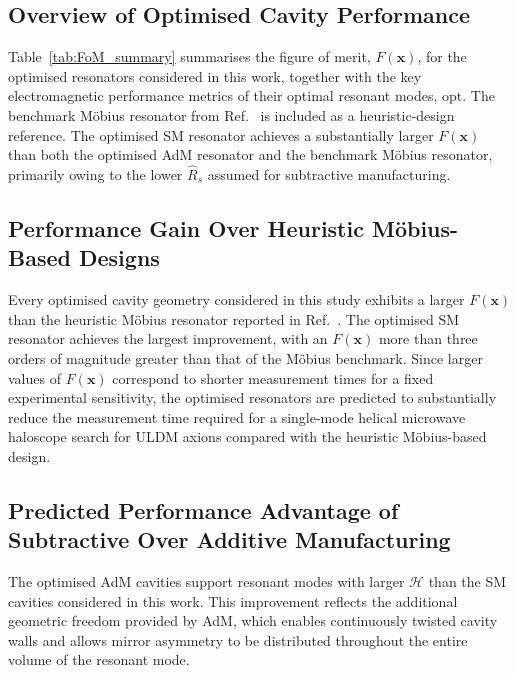 \documentclass[
  aps,
  physrev,
  reprint,
  superscriptaddress,
  nofootinbib,
  amsmath,
  amssymb
]{revtex4-2}
\begin{document}
\subsection{Overview of Optimised Cavity Performance}
\label{sec:results_overview}

Table~\ref{tab:FoM_summary} summarises the figure of merit, $F(\mathbf{x})$, for the optimised resonators considered in this work, together with the key electromagnetic performance metrics of their optimal resonant modes, ${\mathrm{opt}}$. The benchmark M\"obius resonator from Ref.~\cite{Bourhill2023} is included as a heuristic-design reference. The optimised SM resonator achieves a substantially larger $F(\mathbf{x})$ than both the optimised AdM resonator and the benchmark Möbius resonator, primarily owing to the lower $\hat{R}_s$ assumed for subtractive manufacturing.


\subsection{Performance Gain Over Heuristic M\"obius-Based Designs}
\label{sec:heuristic_mobius}

Every optimised cavity geometry considered in this study exhibits a larger $F(\mathbf{x})$ than the heuristic M\"obius resonator reported in Ref.~\cite{Bourhill2023}. The optimised SM resonator achieves the largest improvement, with an $F(\mathbf{x})$ more than three orders of magnitude greater than that of the M\"obius benchmark. Since larger values of $F(\mathbf{x})$ correspond to shorter measurement times for a fixed experimental sensitivity, the optimised resonators are predicted to substantially reduce the measurement time required for a single-mode helical microwave haloscope search for ULDM axions compared with the heuristic M\"obius-based design.

\subsection{Predicted Performance Advantage of Subtractive Over Additive Manufacturing}
\label{sec:disc_add_vs_sub}

The optimised AdM cavities support resonant modes with larger $\mathscr H$ than the SM cavities considered in this work. This improvement reflects the additional geometric freedom provided by AdM, which enables continuously twisted cavity walls and allows mirror asymmetry to be distributed throughout the entire volume of the resonant mode. 
\end{document}
